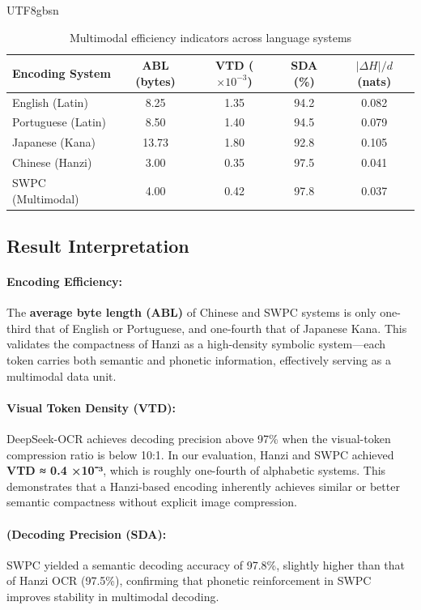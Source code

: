 \documentclass[conference]{IEEEtran}
\begin{document}
\begin{CJK*}{UTF8}{gbsn}
\begin{table}[htbp]
\centering
\caption{Multimodal efficiency indicators across language systems}
\label{tab:efficiency_metrics}
\footnotesize
\renewcommand{\arraystretch}{1.2}
\begin{tabular}{|l|c|c|c|c|}
\hline
\toprule
\textbf{Encoding System} & \textbf{ABL (bytes)} & \textbf{VTD ($\times10^{-3}$)} & \textbf{SDA (\%)} & \textbf{$|\Delta H|/d$ (nats)} \\
\midrule
\hline
English (Latin) & 8.25 & 1.35 & 94.2 & 0.082 \\
\hline
Portuguese (Latin) & 8.50 & 1.40 & 94.5 & 0.079 \\
\hline
Japanese (Kana) & 13.73 & 1.80 & 92.8 & 0.105 \\
\hline
Chinese (Hanzi) & 3.00 & 0.35 & 97.5 & 0.041 \\
\hline
SWPC (Multimodal) & 4.00 & 0.42 & 97.8 & 0.037 \\
\hline
\bottomrule
\end{tabular}
\end{table}

\subsection{Result Interpretation}

\paragraph{Encoding Efficiency:}  
The \textbf{average byte length (ABL)} of Chinese and SWPC systems is only one-third that of English or Portuguese, and one-fourth that of Japanese Kana.  
This validates the compactness of Hanzi as a high-density symbolic system—each token carries both semantic and phonetic information, effectively serving as a multimodal data unit.

\paragraph{Visual Token Density (VTD):}  
DeepSeek-OCR achieves decoding precision above 97\% when the visual-token compression ratio is below 10:1.  
In our evaluation, Hanzi and SWPC achieved \textbf{VTD ≈ 0.4 ×10⁻³}, which is roughly one-fourth of alphabetic systems.  
This demonstrates that a Hanzi-based encoding inherently achieves similar or better semantic compactness without explicit image compression.

\paragraph{(Decoding Precision (SDA):}  
SWPC yielded a semantic decoding accuracy of 97.8\%, slightly higher than that of Hanzi OCR (97.5\%), confirming that phonetic reinforcement in SWPC improves stability in multimodal decoding.


\end{CJK*}
\end{document}

